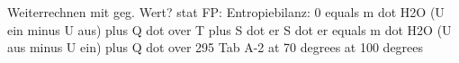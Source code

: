 Weiterrechnen mit geg. Wert?  
stat FP: Entropiebilanz:  
0 equals m dot H2O (U ein minus U aus) plus Q dot over T plus S dot er  
S dot er equals m dot H2O (U aus minus U ein) plus Q dot over 295  
Tab A-2 at 70 degrees at 100 degrees